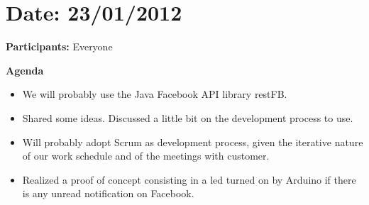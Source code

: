 \section{Date: 23/01/2012}

\textbf{Participants:} Everyone

\textbf{Agenda}

\begin{itemize}
	\item We will probably use the Java Facebook API library restFB. 
	\item Shared some ideas. Discussed a little bit on the development process to use.
	\item Will probably adopt Scrum as development process, given the iterative nature of our work schedule and of the meetings with customer.
	\item Realized a proof of concept consisting in a led turned on by Arduino if there is any unread notification on Facebook.
\end{itemize}

